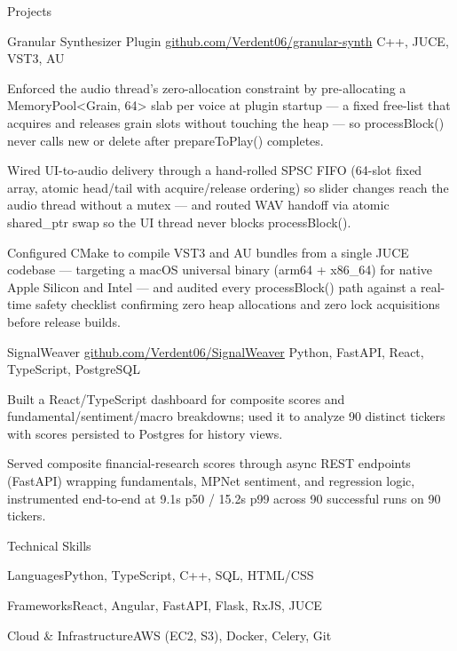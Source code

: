 \documentclass[
	11pt
]{../../../template}
\begin{document}
	\begin{rSection}{P}{rojects}
		\begin{rSectionEntry}
			{Granular Synthesizer Plugin}
			{\href{https://github.com/Verdent06/granular-synth}{github.com/Verdent06/granular-synth}}
			{}
			{C++, JUCE, VST3, AU}
			{}

			\item Enforced the audio thread's zero-allocation constraint by pre-allocating a MemoryPool\textless{}Grain, 64\textgreater{} slab per voice at plugin startup --- a fixed free-list that acquires and releases grain slots without touching the heap --- so processBlock() never calls new or delete after prepareToPlay() completes.
			\item Wired UI-to-audio delivery through a hand-rolled SPSC FIFO (64-slot fixed array, atomic head/tail with acquire/release ordering) so slider changes reach the audio thread without a mutex --- and routed WAV handoff via atomic shared\_ptr swap so the UI thread never blocks processBlock().
			\item Configured CMake to compile VST3 and AU bundles from a single JUCE codebase --- targeting a macOS universal binary (arm64 + x86\_64) for native Apple Silicon and Intel --- and audited every processBlock() path against a real-time safety checklist confirming zero heap allocations and zero lock acquisitions before release builds.
		\end{rSectionEntry}

		\begin{rSectionEntry}
			{SignalWeaver}
			{\href{https://github.com/Verdent06/SignalWeaver}{github.com/Verdent06/SignalWeaver}}
			{}
			{Python, FastAPI, React, TypeScript, PostgreSQL}
			{}

			\item Built a React/TypeScript dashboard for composite scores and fundamental/sentiment/macro breakdowns; used it to analyze 90 distinct tickers with scores persisted to Postgres for history views.
			\item Served composite financial-research scores through async REST endpoints (FastAPI) wrapping fundamentals, MPNet sentiment, and regression logic, instrumented end-to-end at 9.1s p50 / 15.2s p99 across 90 successful runs on 90 tickers.
		\end{rSectionEntry}
	\end{rSection}

	\begin{rSection}{T}{echnical Skills}
		\begin{rSet}{Languages}{Python, TypeScript, C++, SQL, HTML/CSS}
		\end{rSet}
		\begin{rSet}{Frameworks}{React, Angular, FastAPI, Flask, RxJS, JUCE}
		\end{rSet}
		\begin{rSet}{Cloud \& Infrastructure}{AWS (EC2, S3), Docker, Celery, Git}
		\end{rSet}
	\end{rSection}
\end{document}
